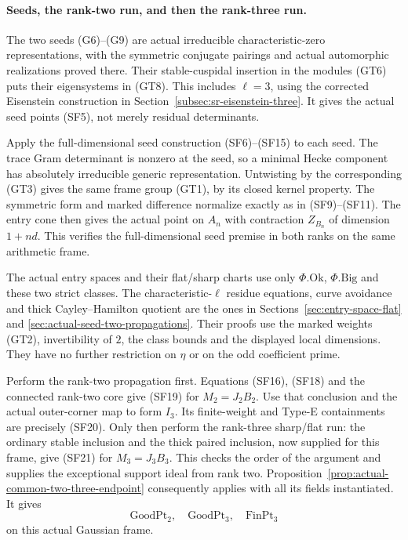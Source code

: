 \paragraph{Seeds, the rank-two run, and then the rank-three run.}
The two seeds (G6)--(G9) are actual irreducible
characteristic-zero representations, with the symmetric
conjugate pairings and actual automorphic realizations
proved there. Their stable-cuspidal insertion in the
modules (GT6) puts their eigensystems in (GT8).
This includes \(\ell=3\), using the corrected
Eisenstein construction in
Section~\ref{subsec:sr-eisenstein-three}.
It gives the actual seed points (SF5), not merely
residual determinants.

Apply the full-dimensional seed construction
(SF6)--(SF15) to each seed.
The trace Gram determinant is nonzero at the seed,
so a minimal Hecke component has absolutely
irreducible generic representation.
Untwisting by the corresponding (GT3) gives the
same frame group (GT1), by its closed kernel property.
The symmetric form and marked difference normalize
exactly as in (SF9)--(SF11).
The entry cone then gives the actual point on
\(A_n\) with contraction \(Z_{B_n}\) of dimension
\(1+nd\).
This verifies the full-dimensional seed premise in
both ranks on the same arithmetic frame.

The actual entry spaces and their flat/sharp charts
use only \(\Phi.\mathrm{Ok}\), \(\Phi.\mathrm{Big}\)
and these two strict classes.
The characteristic-\(\ell\) residue equations,
curve avoidance and thick Cayley--Hamilton quotient
are the ones in
Sections~\ref{sec:entry-space-flat} and
\ref{sec:actual-seed-two-propagations}.
Their proofs use the marked weights (GT2),
invertibility of \(2\), the class bounds and the
displayed local dimensions.
They have no further restriction on \(\eta\) or on
the odd coefficient prime.

Perform the rank-two propagation first.
Equations (SF16), (SF18) and the connected
rank-two core give (SF19) for \(M_2=J_2B_2\).
Use that conclusion and the actual outer-corner map
to form \(I_3\). Its finite-weight and Type-E
containments are precisely (SF20).
Only then perform the rank-three sharp/flat run:
the ordinary stable inclusion and the thick paired
inclusion, now supplied for this frame, give (SF21)
for \(M_3=J_3B_3\).
This checks the order of the argument and supplies
the exceptional support ideal from rank two.
Proposition~\ref{prop:actual-common-two-three-endpoint}
consequently applies with all its fields instantiated.
It gives
\[
                     \mathrm{GoodPt}_2,\quad
                     \mathrm{GoodPt}_3,\quad
                     \mathrm{FinPt}_3
 \tag{GT9}
\]
on this actual Gaussian frame.

